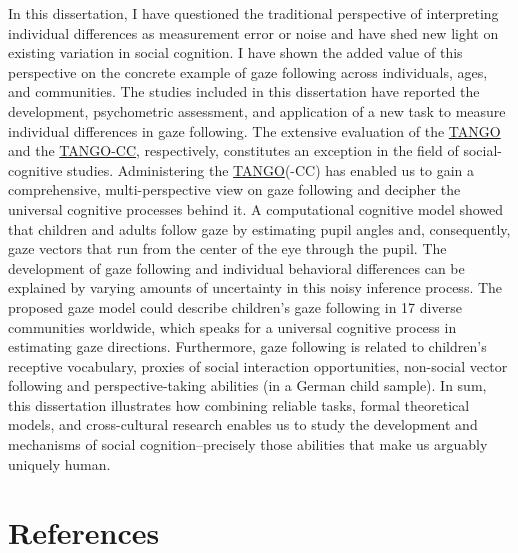 \documentclass[
]{scrbook}
\begin{document}
In this dissertation, I have questioned the traditional perspective of interpreting individual differences as measurement error or noise and have shed new light on existing variation in social cognition. I have shown the added value of this perspective on the concrete example of gaze following across individuals, ages, and communities. The studies included in this dissertation have reported the development, psychometric assessment, and application of a new task to measure individual differences in gaze following. The extensive evaluation of the \hyperref[acronyms_TANGO]{TANGO} and the \hyperref[acronyms_TANGO-CC]{TANGO-CC}, respectively, constitutes an exception in the field of social-cognitive studies. Administering the \hyperref[acronyms_TANGO]{TANGO}(-CC) has enabled us to gain a comprehensive, multi-perspective view on gaze following and decipher the universal cognitive processes behind it. A computational cognitive model showed that children and adults follow gaze by estimating pupil angles and, consequently, gaze vectors that run from the center of the eye through the pupil. The development of gaze following and individual behavioral differences can be explained by varying amounts of uncertainty in this noisy inference process. The proposed gaze model could describe children's gaze following in 17 diverse communities worldwide, which speaks for a universal cognitive process in estimating gaze directions. Furthermore, gaze following is related to children's receptive vocabulary, proxies of social interaction opportunities, non-social vector following and perspective-taking abilities (in a German child sample). In sum, this dissertation illustrates how combining reliable tasks, formal theoretical models, and cross-cultural research enables us to study the development and mechanisms of social cognition\thinspace --\thinspace precisely those abilities that make us arguably uniquely human.

\backmatter

\chapter{References}\label{references}
\end{document}
